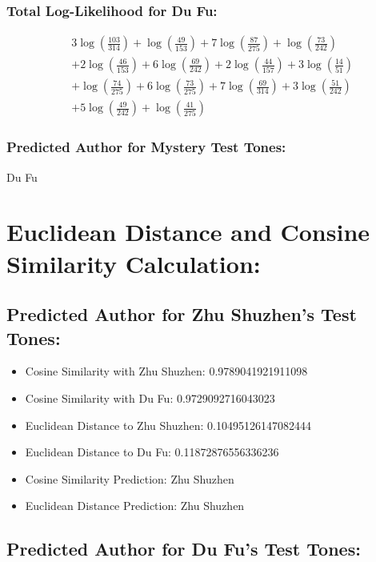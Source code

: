 \documentclass[12pt]{article}
\begin{document}
\subsubsection*{Total Log-Likelihood for Du Fu:}

\[
\begin{aligned}
    &3 \log\left(\frac{103}{314}\right) + \log\left(\frac{49}{153}\right) + 7 \log\left(\frac{87}{275}\right) + \log\left(\frac{73}{242}\right) \\
    &+ 2 \log\left(\frac{46}{153}\right) + 6 \log\left(\frac{69}{242}\right) + 2 \log\left(\frac{44}{157}\right) + 3 \log\left(\frac{14}{51}\right) \\
    &+ \log\left(\frac{74}{275}\right) + 6 \log\left(\frac{73}{275}\right) + 7 \log\left(\frac{69}{314}\right) + 3 \log\left(\frac{51}{242}\right) \\
    &+ 5 \log\left(\frac{49}{242}\right) + \log\left(\frac{41}{275}\right)
\end{aligned}
\]

\subsubsection*{Predicted Author for Mystery Test Tones: }
Du Fu

\section*{Euclidean Distance and Consine Similarity Calculation: }


\subsection*{Predicted Author for Zhu Shuzhen's Test Tones:}

\begin{itemize}
    \item Cosine Similarity with Zhu Shuzhen: 0.9789041921911098
    \item Cosine Similarity with Du Fu: 0.9729092716043023
    \item Euclidean Distance to Zhu Shuzhen: 0.10495126147082444
    \item Euclidean Distance to Du Fu: 0.11872876556336236
    \item Cosine Similarity Prediction: Zhu Shuzhen
    \item Euclidean Distance Prediction: Zhu Shuzhen
\end{itemize}

\subsection*{Predicted Author for Du Fu's Test Tones:}
\end{document}
